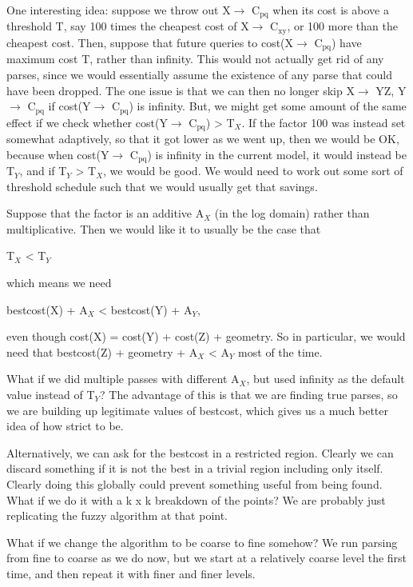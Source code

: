 \documentclass{book}
\begin{document}
\begin{itemize}
    One interesting idea: suppose we throw out X$\to$ C$_{\mathrm{pq}}$ when its cost
    is above a threshold T, say 100 times the cheapest cost of X$\to$
    C$_{\mathrm{xy}}$, or 100 more than the cheapest cost. Then, suppose that
    future queries to cost(X$\to$ C$_{\mathrm{pq}}$) have maximum cost T, rather than
    infinity. This would not actually get rid of any parses, since we
    would essentially assume the existence of any parse that could
    have been dropped. The one issue is that we can then no longer
    skip X$\to$ YZ, Y$\to$ C$_{\mathrm{pq}}$ if cost(Y$\to$ C$_{\mathrm{pq}}$) is infinity. But, we
    might get some amount of the same effect if we check whether
    cost(Y$\to$ C$_{\mathrm{pq}}$) > T$_X$. If the factor 100 was instead set somewhat
    adaptively, so that it got lower as we went up, then we would be
    OK, because when cost(Y$\to$ C$_{\mathrm{pq}}$) is infinity in the current model,
    it would instead be T$_Y$, and if T$_Y$ > T$_X$, we would be good. We
    would need to work out some sort of threshold schedule such that
    we would usually get that savings.

    Suppose that the factor is an additive A$_X$ (in the log domain)
    rather than multiplicative. Then we would like it to usually be
    the case that

      T$_X$ < T$_Y$

    which means we need

      bestcost(X) + A$_X$ < bestcost(Y) + A$_Y$, 

    even though cost(X) = cost(Y) + cost(Z) + geometry. So in
    particular, we would need that bestcost(Z) + geometry + A$_X$ < A$_Y$
    most of the time.

    What if we did multiple passes with different A$_X$, but used
    infinity as the default value instead of T$_Y$? The advantage of
    this is that we are finding true parses, so we are building up
    legitimate values of bestcost, which gives us a much better idea
    of how strict to be.
    
    Alternatively, we can ask for the bestcost in a restricted
    region. Clearly we can discard something if it is not the best in
    a trivial region including only itself. Clearly doing this
    globally could prevent something useful from being found. What if
    we do it with a k x k breakdown of the points? We are probably
    just replicating the fuzzy algorithm at that point.

    What if we change the algorithm to be coarse to fine somehow? We
    run parsing from fine to coarse as we do now, but we start at a
    relatively coarse level the first time, and then repeat it with
    finer and finer levels.


\end{itemize}
\end{document}
